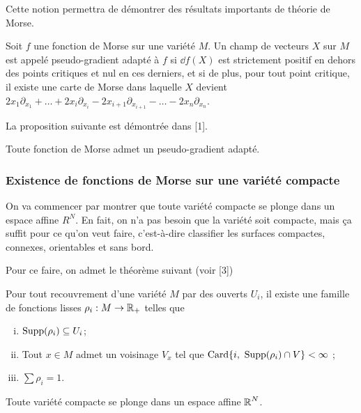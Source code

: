 Cette notion permettra de démontrer des résultats importants de théorie de Morse.
\begin{defi}
    Soit $f$ une fonction de Morse sur une variété $M$. 
    Un champ de vecteurs $X$ sur $M$ est appelé pseudo-gradient adapté à $f$ si 
    $\dd f(X)$ est strictement positif en dehors des points critiques et nul en 
    ces derniers, et si de plus, pour tout point critique, il existe une carte 
    de Morse dans laquelle $X$ devient 
    $2x_1\partial_{x_1}+\dots+2x_i\partial_{x_i}-2x_{i+1}\partial_{x_{i+1}}-\dots-2x_n\partial_{x_n}$.
\end{defi}

La proposition suivante est démontrée dans [1].
\begin{prop}
    Toute fonction de Morse admet un pseudo-gradient adapté.
\end{prop}

\subsubsection{Existence de fonctions de Morse sur une variété compacte}
On va commencer par montrer que toute variété compacte se plonge dans un espace affine $R^N$. 
En fait, on n'a pas besoin que la variété soit compacte, mais ça suffit pour ce qu'on veut faire, 
c'est-à-dire classifier les surfaces compactes, connexes, orientables et sans bord.

Pour ce faire, on admet le théorème suivant (voir [3])
\begin{thm}
    Pour tout recouvrement d'une variété $M$ par des ouverts $U_i$, il existe une famille 
    de fonctions lisses $\rho_i:M\to \operatorname{\mathbb R}_+$ telles que 
    \begin{enumerate}[(i)]
        \item $\operatorname{Supp}(\rho_i)\subseteq U_i$;
        \item Tout $x\in M$ admet un voisinage $V_x$ tel que 
        $\operatorname{Card}\lbrace i,\ \operatorname{Supp}(\rho_i)\cap V\rbrace<\infty$ ;
        \item $\sum\rho_i=1$.
    \end{enumerate}
\end{thm}

\begin{thm}
    Toute variété compacte se plonge dans un espace affine $\operatorname{\mathbb R}^N$.
\end{thm}

